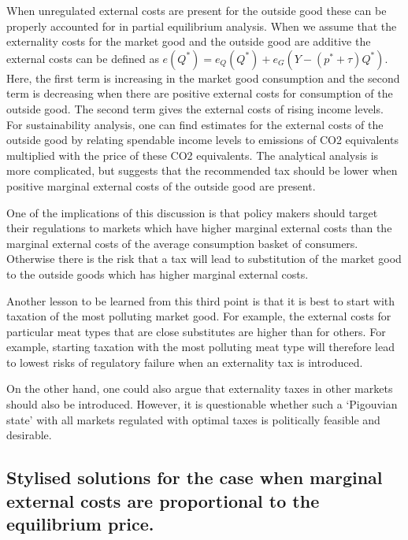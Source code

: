 \documentclass[
]{book}
\begin{document}
When unregulated external costs are present for the outside good these can be properly accounted for in partial equilibrium analysis. When we assume that the externality costs for the market good and the outside good are additive the external costs can be defined as \(e(Q^* )=e_Q (Q^* )+e_G (Y-(p^*+\tau)Q^* )\). Here, the first term is increasing in the market good consumption and the second term is decreasing when there are positive external costs for consumption of the outside good. The second term gives the external costs of rising income levels. For sustainability analysis, one can find estimates for the external costs of the outside good by relating spendable income levels to emissions of CO2 equivalents multiplied with the price of these CO2 equivalents. The analytical analysis is more complicated, but suggests that the recommended tax should be lower when positive marginal external costs of the outside good are present.

One of the implications of this discussion is that policy makers should target their regulations to markets which have higher marginal external costs than the marginal external costs of the average consumption basket of consumers. Otherwise there is the risk that a tax will lead to substitution of the market good to the outside goods which has higher marginal external costs.

Another lesson to be learned from this third point is that it is best to start with taxation of the most polluting market good. For example, the external costs for particular meat types that are close substitutes are higher than for others. For example, starting taxation with the most polluting meat type will therefore lead to lowest risks of regulatory failure when an externality tax is introduced.

On the other hand, one could also argue that externality taxes in other markets should also be introduced. However, it is questionable whether such a `Pigouvian state' with all markets regulated with optimal taxes is politically feasible and desirable.

\hypertarget{stylised-solutions-for-the-case-when-marginal-external-costs-are-proportional-to-the-equilibrium-price.}{%
\subsection{Stylised solutions for the case when marginal external costs are proportional to the equilibrium price.}\label{stylised-solutions-for-the-case-when-marginal-external-costs-are-proportional-to-the-equilibrium-price.}}
\end{document}

